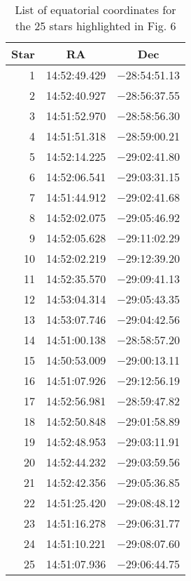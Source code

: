 \newpage

\begin{table}
\begin{center}
\begin{tabular}{|r|l|l|}
\hline
  \multicolumn{1}{|c|}{Star} &
  \multicolumn{1}{c|}{RA} &
  \multicolumn{1}{c|}{Dec} \\
\hline
  1 & 14:52:49.429 & $-$28:54:51.13\\
  2 & 14:52:40.927 & $-$28:56:37.55\\
  3 & 14:51:52.970 & $-$28:58:56.30\\
  4 & 14:51:51.318 & $-$28:59:00.21\\
  5 & 14:52:14.225 & $-$29:02:41.80\\
  6 & 14:52:06.541 & $-$29:03:31.15\\
  7 & 14:51:44.912 & $-$29:02:41.68\\
  8 & 14:52:02.075 & $-$29:05:46.92\\
  9 & 14:52:05.628 & $-$29:11:02.29\\
  10 & 14:52:02.219 & $-$29:12:39.20\\
  11 & 14:52:35.570 & $-$29:09:41.13\\
  12 & 14:53:04.314 & $-$29:05:43.35\\
  13 & 14:53:07.746 & $-$29:04:42.56\\
  14 & 14:51:00.138 & $-$28:58:57.20\\
  15 & 14:50:53.009 & $-$29:00:13.11\\
  16 & 14:51:07.926 & $-$29:12:56.19\\
  17 & 14:52:56.981 & $-$28:59:47.82\\
  18 & 14:52:50.848 & $-$29:01:58.89\\
  19 & 14:52:48.953 & $-$29:03:11.91\\
  20 & 14:52:44.232 & $-$29:03:59.56\\
  21 & 14:52:42.356 & $-$29:05:36.85\\
  22 & 14:51:25.420 & $-$29:08:48.12\\
  23 & 14:51:16.278 & $-$29:06:31.77\\
  24 & 14:51:10.221 & $-$29:08:07.60\\
  25 & 14:51:07.936 & $-$29:06:44.75\\
\hline\end{tabular}
\caption{List of equatorial coordinates for the 25 stars highlighted in Fig. 6}
\end{center}
\end{table}

